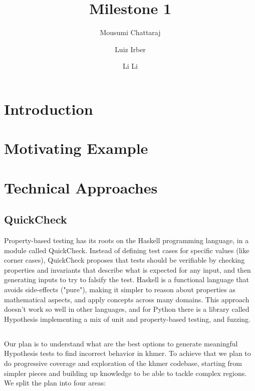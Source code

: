 \documentclass[preprint,nocopyrightspace]{sig-alternate}
\begin{document}
%

\title{Milestone 1}

\author{Mousumi Chattaraj}
\author{Luiz Irber}
\author{Li Li}


\maketitle

\begin{abstract}


\end{abstract}

\section{Introduction}

\section{Motivating Example}

\section{Technical Approaches}

\subsection{QuickCheck}
Property-based testing has its roots on the Haskell programming language, in a module called QuickCheck. Instead of defining test cases for specific values (like corner cases), QuickCheck proposes that tests should be verifiable by checking properties and invariants that describe what is expected for any input, and then generating inputs to try to falsify the test.
Haskell is a functional language that avoids side-effects ("pure"), making it simpler to reason about properties as mathematical aspects, and apply concepts across many domains. This approach doesn't work so well in other languages, and for Python there is a library called Hypothesis implementing a mix of unit and property-based testing, and fuzzing.

\subsection{}
Our plan is to understand what are the best options to generate meaningful Hypothesis tests to find incorrect behavior in khmer.
To achieve that we plan to do progressive coverage and exploration of the khmer codebase, starting from simpler pieces and building up knowledge to be able to tackle complex regions. We split the plan into four areas:
\end{document}

